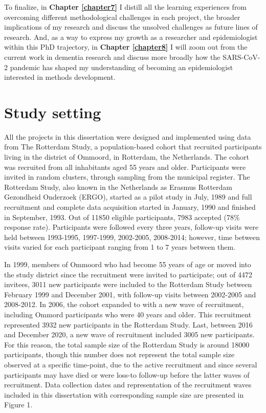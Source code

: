 \documentclass[
]{book}
\begin{document}
To finalize, in \textbf{Chapter \ref{chapter7}} I distill all the learning experiences from overcoming different methodological challenges in each project, the broader implications of my research and discuss the unsolved challenges as future lines of research. And, as a way to express my growth as a researcher and epidemiologist within this PhD trajectory, in \textbf{Chapter \ref{chapter8}} I will zoom out from the current work in dementia research and discuss more broadly how the SARS-CoV-2 pandemic has shaped my understanding of becoming an epidemiologist interested in methods development.

\newpage

\hypertarget{study-setting}{%
\section{Study setting}\label{study-setting}}

All the projects in this dissertation were designed and implemented using data from The Rotterdam Study, a population-based cohort that recruited participants living in the district of Ommoord, in Rotterdam, the Netherlands. The cohort was recruited from all inhabitants aged 55 years and older. Participants were invited in random clusters, through sampling from the municipal register\autocite{hofman1991}. The Rotterdam Study, also known in the Netherlands as Erasmus Rotterdam Gezondheid Onderzoek (ERGO), started as a pilot study in July, 1989 and full recruitment and complete data acquisition started in January, 1990 and finished in September, 1993. Out of 11850 eligible participants, 7983 accepted (78\% response rate). Participants were followed every three years, follow-up visits were held between 1993-1995, 1997-1999, 2002-2005, 2008-2014; however, time between visits varied for each participant ranging from 1 to 7 years between them.

In 1999, members of Ommoord who had become 55 years of age or moved into the study district since the recruitment were invited to participate; out of 4472 invitees, 3011 new participants were included to the Rotterdam Study\autocite{hofman2007} between February 1999 and December 2001, with follow-up visits between 2002-2005 and 2008-2012. In 2006, the cohort expanded to with a new wave of recruitment, including Ommord participants who were 40 years and older. This recruitment represented 3932 new participants in the Rotterdam Study. Last, between 2016 and December 2020, a new wave of recruitment included 3005 new participants. For this reason, the total sample size of the Rotterdam Study is around 18000 participants, though this number does not represent the total sample size observed at a specific time-point, due to the active recruitment and since several participants may have died or were loss-to follow-up before the latter waves of recruitment. Data collection dates and representation of the recruitment waves included in this dissertation with corresponding sample size are presented in Figure 1.
\end{document}
